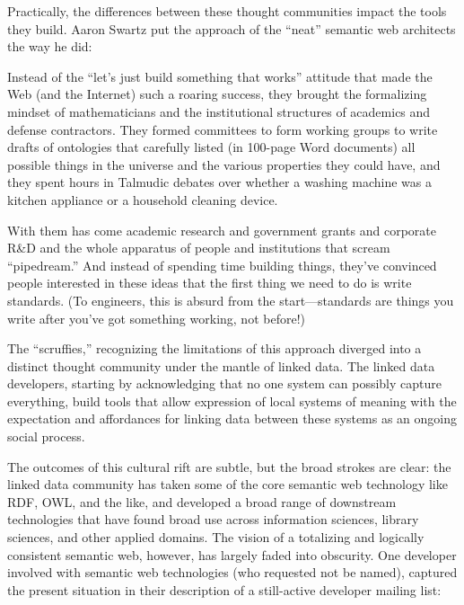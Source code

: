 \documentclass[10pt]{article}
\begin{document}
\begin{multicols}{2}
Practically, the differences between these thought communities impact
the tools they build. Aaron Swartz put the approach of the ``neat''
semantic web architects the way he did:

\begin{leftbar}
Instead of the ``let's just build something that works'' attitude that
made the Web (and the Internet) such a roaring success, they brought the
formalizing mindset of mathematicians and the institutional structures
of academics and defense contractors. They formed committees to form
working groups to write drafts of ontologies that carefully listed (in
100-page Word documents) all possible things in the universe and the
various properties they could have, and they spent hours in Talmudic
debates over whether a washing machine was a kitchen appliance or a
household cleaning device.

With them has come academic research and government grants and corporate
R\&D and the whole apparatus of people and institutions that scream
``pipedream.'' And instead of spending time building things, they've
convinced people interested in these ideas that the first thing we need
to do is write standards. (To engineers, this is absurd from the
start---standards are things you write after you've got something
working, not before!) \cite{swartzAaronSwartzProgrammable2013} 
\end{leftbar}

The ``scruffies,'' recognizing the limitations of this approach diverged
into a distinct thought community under the mantle of linked data. The
linked data developers, starting by acknowledging that no one system can
possibly capture everything, build tools that allow expression of local
systems of meaning with the expectation and affordances for linking data
between these systems as an ongoing social process.

The outcomes of this cultural rift are subtle, but the broad strokes are
clear: the linked data community has taken some of the core semantic web
technology like RDF, OWL, and the like, and developed a broad range of
downstream technologies that have found broad use across information
sciences, library sciences, and other applied domains. The vision of a
totalizing and logically consistent semantic web, however, has largely
faded into obscurity. One developer involved with semantic web
technologies (who requested not be named), captured the present
situation in their description of a still-active developer mailing list:


\end{multicols}
\end{document}
